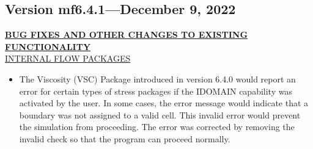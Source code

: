 	\subsection{Version mf6.4.1---December 9, 2022}
	
	\textbf{\underline{BUG FIXES AND OTHER CHANGES TO EXISTING FUNCTIONALITY}} \\

	\underline{INTERNAL FLOW PACKAGES}
	\begin{itemize}
		\item The Viscosity (VSC) Package introduced in version 6.4.0 would report an error for certain types of stress packages if the IDOMAIN capability was activated by the user.  In some cases, the error message would indicate that a boundary was not assigned to a valid cell.  This invalid error would prevent the simulation from proceeding.  The error was corrected by removing the invalid check so that the program can proceed normally.
	\end{itemize}
